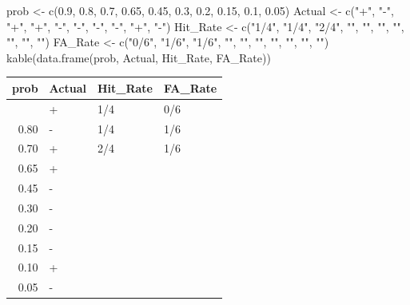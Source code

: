 \documentclass[
  letterpaper,
  DIV=11,
  numbers=noendperiod]{scrreprt}
\newenvironment{Shaded}{\begin{snugshade}}{\end{snugshade}}
\newcommand{\FloatTok}[1]{\textcolor[rgb]{0.68,0.00,0.00}{#1}}
\newcommand{\FunctionTok}[1]{\textcolor[rgb]{0.28,0.35,0.67}{#1}}
\newcommand{\NormalTok}[1]{\textcolor[rgb]{0.00,0.23,0.31}{#1}}
\newcommand{\OtherTok}[1]{\textcolor[rgb]{0.00,0.23,0.31}{#1}}
\newcommand{\StringTok}[1]{\textcolor[rgb]{0.13,0.47,0.30}{#1}}
\begin{document}
\begin{Shaded}
\begin{Highlighting}[]
\NormalTok{prob }\OtherTok{\textless{}{-}} \FunctionTok{c}\NormalTok{(}\FloatTok{0.9}\NormalTok{, }\FloatTok{0.8}\NormalTok{, }\FloatTok{0.7}\NormalTok{, }\FloatTok{0.65}\NormalTok{, }\FloatTok{0.45}\NormalTok{, }\FloatTok{0.3}\NormalTok{, }\FloatTok{0.2}\NormalTok{, }\FloatTok{0.15}\NormalTok{, }\FloatTok{0.1}\NormalTok{, }\FloatTok{0.05}\NormalTok{)}
\NormalTok{Actual }\OtherTok{\textless{}{-}} \FunctionTok{c}\NormalTok{(}\StringTok{"+"}\NormalTok{, }\StringTok{"{-}"}\NormalTok{, }\StringTok{"+"}\NormalTok{, }\StringTok{"+"}\NormalTok{, }\StringTok{"{-}"}\NormalTok{, }\StringTok{"{-}"}\NormalTok{, }\StringTok{"{-}"}\NormalTok{, }\StringTok{"{-}"}\NormalTok{, }\StringTok{"+"}\NormalTok{, }\StringTok{"{-}"}\NormalTok{)}
\NormalTok{Hit\_Rate }\OtherTok{\textless{}{-}} \FunctionTok{c}\NormalTok{(}\StringTok{"1/4"}\NormalTok{, }\StringTok{"1/4"}\NormalTok{, }\StringTok{"2/4"}\NormalTok{, }\StringTok{""}\NormalTok{, }\StringTok{""}\NormalTok{, }\StringTok{""}\NormalTok{, }\StringTok{""}\NormalTok{, }\StringTok{""}\NormalTok{, }\StringTok{""}\NormalTok{, }\StringTok{""}\NormalTok{)}
\NormalTok{FA\_Rate }\OtherTok{\textless{}{-}} \FunctionTok{c}\NormalTok{(}\StringTok{"0/6"}\NormalTok{, }\StringTok{"1/6"}\NormalTok{, }\StringTok{"1/6"}\NormalTok{, }\StringTok{""}\NormalTok{, }\StringTok{""}\NormalTok{, }\StringTok{""}\NormalTok{, }\StringTok{""}\NormalTok{, }\StringTok{""}\NormalTok{, }\StringTok{""}\NormalTok{, }\StringTok{""}\NormalTok{)}
\FunctionTok{kable}\NormalTok{(}\FunctionTok{data.frame}\NormalTok{(prob, Actual, Hit\_Rate, FA\_Rate))}
\end{Highlighting}
\end{Shaded}

\begin{longtable}[]{@{}rlll@{}}
\toprule\noalign{}
prob & Actual & Hit\_Rate & FA\_Rate \\
\midrule\noalign{}
\endhead
\bottomrule\noalign{}
\endlastfoot
0.90 & + & 1/4 & 0/6 \\
0.80 & - & 1/4 & 1/6 \\
0.70 & + & 2/4 & 1/6 \\
0.65 & + & & \\
0.45 & - & & \\
0.30 & - & & \\
0.20 & - & & \\
0.15 & - & & \\
0.10 & + & & \\
0.05 & - & & \\
\end{longtable}
\end{document}

